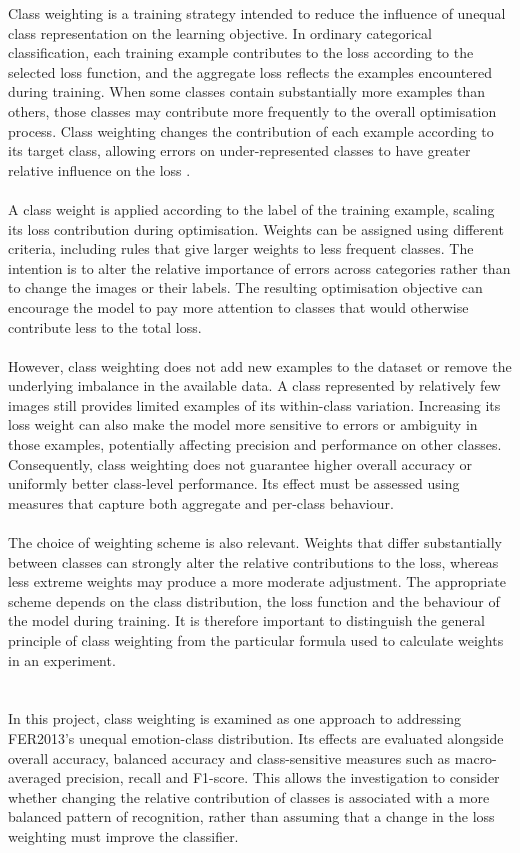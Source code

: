 \documentclass[12pt, a4paper]{report}
\begin{document}
				Class weighting is a training strategy intended to reduce the influence of unequal class representation on the learning objective. In ordinary categorical classification, each training example contributes to the loss according to the selected loss function, and the aggregate loss reflects the examples encountered during training. When some classes contain substantially more examples than others, those classes may contribute more frequently to the overall optimisation process. Class weighting changes the contribution of each example according to its target class, allowing errors on under-represented classes to have greater relative influence on the loss \cite{Johnson2019ClassImbalance, Cui2019ClassBalanced}.\\\\
				A class weight is applied according to the label of the training example, scaling its loss contribution during optimisation. Weights can be assigned using different criteria, including rules that give larger weights to less frequent classes. The intention is to alter the relative importance of errors across categories rather than to change the images or their labels. The resulting optimisation objective can encourage the model to pay more attention to classes that would otherwise contribute less to the total loss.\\\\
				However, class weighting does not add new examples to the dataset or remove the underlying imbalance in the available data. A class represented by relatively few images still provides limited examples of its within-class variation. Increasing its loss weight can also make the model more sensitive to errors or ambiguity in those examples, potentially affecting precision and performance on other classes. Consequently, class weighting does not guarantee higher overall accuracy or uniformly better class-level performance. Its effect must be assessed using measures that capture both aggregate and per-class behaviour.\\\\
				The choice of weighting scheme is also relevant. Weights that differ substantially between classes can strongly alter the relative contributions to the loss, whereas less extreme weights may produce a more moderate adjustment. The appropriate scheme depends on the class distribution, the loss function and the behaviour of the model during training. It is therefore important to distinguish the general principle of class weighting from the particular formula used to calculate weights in an experiment.\\\\\\
				In this project, class weighting is examined as one approach to addressing FER2013's unequal emotion-class distribution. Its effects are evaluated alongside overall accuracy, balanced accuracy and class-sensitive measures such as macro-averaged precision, recall and F1-score. This allows the investigation to consider whether changing the relative contribution of classes is associated with a more balanced pattern of recognition, rather than assuming that a change in the loss weighting must improve the classifier.
				
\end{document}
